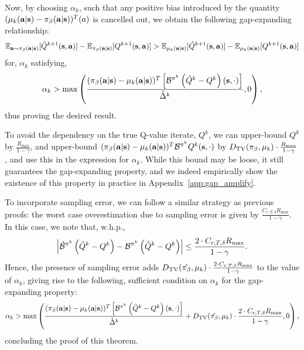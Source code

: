 Now, by choosing $\alpha_k$, such that any positive bias introduced by the quantity $(\mu_k(\mathbf{a}|\mathbf{s}) - {\pi_\beta}(\mathbf{a}|\mathbf{s}))^T (a)$ is cancelled out, we obtain the following gap-expanding relationship:
\begin{equation*}
    \mathbb{E}_{\mathbf{a} \sim {\pi_\beta}(\mathbf{a}|\mathbf{s})}[\hat{Q}^{k+1}(\mathbf{s}, \mathbf{a})] - \mathbb{E}_{{\pi_\beta}(\mathbf{a}|\mathbf{s})}[{Q}^{k+1}(\mathbf{s}, \mathbf{a})] > \mathbb{E}_{\mu_k(\mathbf{a}|\mathbf{s})}[\hat{Q}^{k+1}(\mathbf{s}, \mathbf{a})] - \mathbb{E}_{\mu_k(\mathbf{a}|\mathbf{s})}[{Q}^{k+1}(\mathbf{s}, \mathbf{a})]
\end{equation*}
for, $\alpha_k$ satisfying, 
\begin{equation*}
    \alpha_k > \max \left(\frac{({\pi_\beta}(\mathbf{a}|\mathbf{s}) - \mu_k(\mathbf{a}|\mathbf{s}))^T \left[ \mathcal{B}^{\pi^k} \left( \hat{Q}^k - Q^k \right)(\mathbf{s}, \cdot) \right]}{\hat{\Delta}^k}, 0\right),
\end{equation*}
thus proving the desired result.

To avoid the dependency on the true Q-value iterate, ${Q}^k$, we can upper-bound $Q^k$ by $\frac{R_{\max}}{1 - \gamma}$, and upper-bound $({\pi_\beta}(\mathbf{a}|\mathbf{s}) - \mu_k(\mathbf{a}|\mathbf{s}))^T \mathcal{B}^{\pi^k} Q^k (\mathbf{s}, \cdot)$ by $D_{\mathrm{TV}}({\pi_\beta}, \mu_k) \cdot \frac{R_{\max}}{1 - \gamma}$, and use this in the expression for $\alpha_k$. While this bound may be loose, it still guarantees the gap-expanding property, and we indeed empirically show the existence of this property in practice in Appendix~\ref{app:gap_amplify}. 

To incorporate sampling error, we can follow a similar strategy as previous proofs: the worst case overestimation due to sampling error is given by $\frac{C_{r, T, \delta} R_{\max}}{1 - \gamma}$. In this case, we note that, w.h.p.,
\begin{equation*}
    \left\vert \hat{\mathcal{B}}^{\pi^k} \left( \hat{Q}^k - Q^k \right) - \mathcal{B}^{\pi^k} \left( \hat{Q}^k - Q^k \right) \right\vert \leq \frac{2 \cdot C_{r, T, \delta} R_{\max}}{1 - \gamma}. 
\end{equation*}
Hence, the presence of sampling error adds $D_{\mathrm{TV}}(\hat{{\pi_\beta}}, \mu_k) \cdot \frac{2 \cdot C_{r, T, \delta} R_{\max}}{1 - \gamma}$ to the value of $\alpha_k$, giving rise to the following, sufficient condition on $\alpha_k$ for the gap-expanding property:
\begin{equation*}
     \alpha_k > \max \left(\frac{({\pi_\beta}(\mathbf{a}|\mathbf{s}) - \mu_k(\mathbf{a}|\mathbf{s}))^T \left[ \mathcal{B}^{\pi^k} \left( \hat{Q}^k - Q^k \right)(\mathbf{s}, \cdot) \right]}{\hat{\Delta}^k} + D_{\mathrm{TV}}(\hat{{\pi_\beta}}, \mu_k) \cdot \frac{2 \cdot C_{r, T, \delta} R_{\max}}{1 - \gamma}, 0\right),
\end{equation*}
concluding the proof of this theorem.

